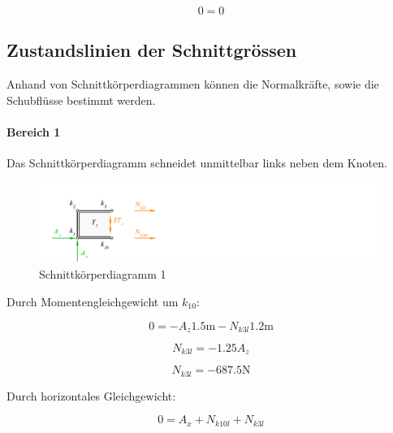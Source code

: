 \documentclass[
  12pt,
  letterpaper,
  DIV=11,
  egregdoesnotlikesansseriftitles]{scrartcl}
\let\oldparagraph\paragraph
\renewcommand{\paragraph}[1]{\oldparagraph{#1}\mbox{}}
\begin{document}
\begin{equation}0 = 0\end{equation}

\hypertarget{zustandslinien-der-schnittgruxf6ssen}{%
\subsection{Zustandslinien der
Schnittgrössen}\label{zustandslinien-der-schnittgruxf6ssen}}

Anhand von Schnittkörperdiagrammen können die Normalkräfte, sowie die
Schubflüsse bestimmt werden.

\hypertarget{bereich-1}{%
\paragraph{Bereich 1}\label{bereich-1}}

Das Schnittkörperdiagramm schneidet unmittelbar links neben dem Knoten.

\begin{figure}[H]

{\centering \includegraphics{BSI_HS23_Testat_03_files/mediabag/../images/Testat_03_HS23_SKD4.pdf}

}

\caption{\label{fig-skd1}Schnittkörperdiagramm 1}

\end{figure}

Durch Momentengleichgewicht um \(k_{10}\):

\begin{equation}0 = - A_{z} 1.5 \text{m} - N_{k3l} 1.2 \text{m}\end{equation}

\begin{equation}N_{k3l} = - 1.25 A_{z}\end{equation}

\begin{equation}N_{k3l} = - 687.5 \text{N}\end{equation}

Durch horizontales Gleichgewicht:

\begin{equation}0 = A_{x} + N_{k10l} + N_{k3l}\end{equation}
\end{document}
